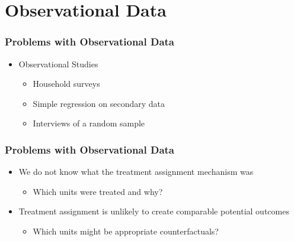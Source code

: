 \documentclass[xcolor=x11names,compress]{beamer}\usepackage[]{graphicx}\usepackage[]{color}
\renewcommand{\(}{\begin{columns}}
\renewcommand{\)}{\end{columns}}
\newcommand{\<}[1]{\begin{column}{#1}}
\renewcommand{\>}{\end{column}}
\begin{document}
\section{Observational Data}

\begin{frame}
\frametitle{Problems with Observational Data}
\begin{itemize}
\item Observational Studies
\begin{itemize}
\item Household surveys
\item Simple regression on secondary data
\item Interviews of a random sample
\end{itemize}
\end{itemize}
\end{frame}

\begin{frame}
\frametitle{Problems with Observational Data}
\begin{itemize}
\item We do not know what the treatment assignment mechanism was
\begin{itemize}
\item Which units were treated and why?
\end{itemize}
\item Treatment assignment is unlikely to create comparable potential outcomes
\begin{itemize}
\item Which units might be appropriate counterfactuals?
\end{itemize}
\end{itemize}
\end{frame}
\end{document}
